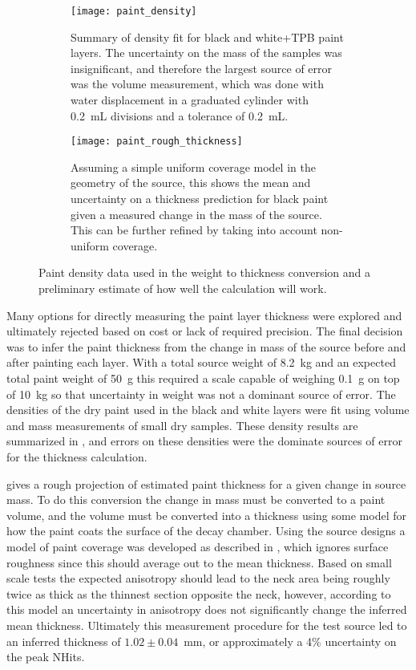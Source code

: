 \begin{figure}
\begin{subfigure}{.45\textwidth}
\texttt{[image: paint\_density]}
\caption{Summary of density fit for black and white+TPB paint layers. The uncertainty on the mass of the samples was insignificant, and therefore the largest source of error was the volume measurement, which was done with water displacement in a graduated cylinder with 0.2~mL divisions and a tolerance of 0.2~mL.}
\label{fig:paintdensity}
\end{subfigure}
\hspace{0.5cm}
\begin{subfigure}{.45\textwidth}
\texttt{[image: paint\_rough\_thickness]}
\caption{Assuming a simple uniform coverage model in the geometry of the source, this shows the mean and uncertainty on a thickness prediction for black paint given a measured change in the mass of the source. This can be further refined by taking into account non-uniform coverage. }
\label{fig:paintthickness}
\end{subfigure}
\caption{Paint density data used in the weight to thickness conversion and a preliminary estimate of how well the calculation will work.}
\label{fig:weightmeasure}
\end{figure}

Many options for directly measuring the paint layer thickness were explored and ultimately rejected based on cost or lack of required precision. The final decision was to infer the paint thickness from the change in mass of the source before and after painting each layer. With a total source weight of 8.2~kg and an expected total paint weight of 50~g this required a scale capable of weighing 0.1~g on top of 10~kg so that uncertainty in weight was not a dominant source of error. The densities of the dry paint used in the black and white layers were fit using volume and mass measurements of small dry samples. These density results are summarized in , and errors on these densities were the dominate sources of error for the thickness calculation. 

 gives a rough projection of estimated paint thickness for a given change in source mass. To do this conversion the change in mass must be converted to a paint volume, and the volume must be converted into a thickness using some model for how the paint coats the surface of the decay chamber. Using the source designs a model of paint coverage was developed as described in , which ignores surface roughness since this should average out to the mean thickness. Based on small scale tests the expected anisotropy should lead to the neck area being roughly twice as thick as the thinnest section opposite the neck, however, according to this model an uncertainty in anisotropy does not significantly change the inferred mean thickness. Ultimately this measurement procedure for the test source led to an inferred thickness of $1.02\pm0.04$~mm, or approximately a 4\% uncertainty on the peak NHits.

